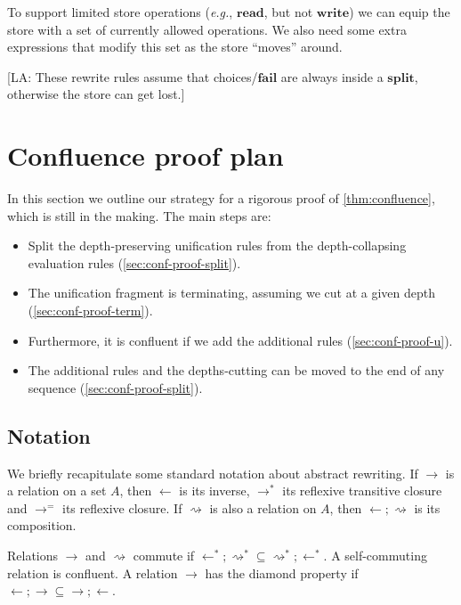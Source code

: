 \documentclass[acmsmall,review,dvipsnames]{acmart}
\newcommand{\eg}{\emph{e.g.}}
\newcommand{\lennart}[1]{{\color{dkcyan} [{LA}: #1]}}
\newcommand{\lennart}[1]{}
\begin{document}
To support limited store operations ({\eg}, \ensuremath{\textbf{read}}, but not \ensuremath{\textbf{write}}) we can equip the store with a set of currently allowed operations.
We also need some extra expressions that modify this set as the store ``moves'' around.

\lennart{These rewrite rules assume that choices/\ensuremath{\textbf{fail}} are always inside a \ensuremath{\textbf{split}}, otherwise the store can get lost.}
\fi

\iffalse
\section{Confluence proof plan}\label{sec:confluence-proof-plan}

In this section we outline our strategy for a rigorous proof of \cref{thm:confluence}, which is still in the making. The main steps are:
\begin{itemize}
\item Split the depth-preserving unification rules from the depth-collapsing evaluation rules (\ref{sec:conf-proof-split}).
\item The unification fragment is terminating, assuming we cut at a given depth (\ref{sec:conf-proof-term}).
\item Furthermore, it is confluent if we add the additional rules (\ref{sec:conf-proof-u}).
\item The additional rules and the depths-cutting can be moved to the end of any sequence (\ref{sec:conf-proof-split}).
\end{itemize}

\subsection{Notation}

We briefly recapitulate some standard notation about abstract rewriting. If $\rightarrow$ is a relation on a set $A$, then $\leftarrow$ is its inverse, $\rightarrow^\ast$ its reflexive transitive closure and $\rightarrow^=$ its reflexive closure. If $\rightsquigarrow$ is also a relation on $A$, then $\leftarrow;\rightsquigarrow$ is its composition.

Relations $\rightarrow$ and $\rightsquigarrow$ commute if $\leftarrow^\ast;\rightsquigarrow^\ast\subseteq \rightsquigarrow^\ast;\leftarrow^\ast$. A self-commuting relation is confluent. A relation $\rightarrow$ has the diamond property if $\leftarrow;\rightarrow\subseteq \rightarrow;\leftarrow$.
\end{document}

